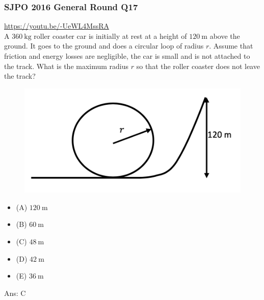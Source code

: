 \documentclass{article}
\begin{document}
\subsubsection{SJPO 2016 General Round Q17}
\url{https://youtu.be/-UeWL4MssRA}\\
A $360 \mathrm{~kg}$ roller coaster car is initially at rest at a height of $120 \mathrm{~m}$ above the ground. It goes to the ground and does a circular loop of radius $r$. Assume that friction and energy losses are negligible, the car is small and is not attached to the track. What is the maximum radius $r$ so that the roller coaster does not leave the track? \\ 
{
\begin{figure}
\includegraphics[width=1.0\linewidth]{images/sjpo2016q17.png}
\end{figure}
\begin{itemize}
\item[] (A) $120 \mathrm{~m}$
\item[] (B) $60 \mathrm{~m}$
\item[] (C) $48 \mathrm{~m}$
\item[] (D) $42 \mathrm{~m}$
\item[] (E) $36 \mathrm{~m}$
\end{itemize}
}
Ans: \ifpaper C \fi
\end{document}
